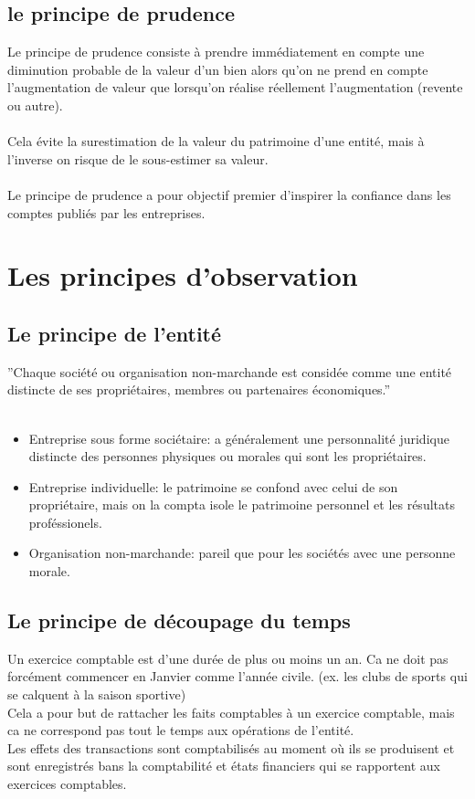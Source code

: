 \documentclass{article}
\begin{document}
\subsection{le principe de prudence}
Le principe de prudence consiste à prendre immédiatement en compte une diminution probable de la valeur d'un bien alors qu'on ne prend en compte l'augmentation de valeur que lorsqu'on réalise réellement l'augmentation (revente ou autre). \\ \\
Cela évite la surestimation de la valeur du patrimoine d'une entité, mais à l'inverse on risque de le sous-estimer sa valeur.\\ \\
Le principe de prudence a pour objectif premier d'inspirer la confiance dans les comptes publiés par les entreprises. \\

\section{Les principes d'observation}
\subsection{Le principe de l'entité}
''Chaque société ou organisation non-marchande est considée comme une entité distincte de ses propriétaires, membres ou partenaires économiques.'' \\ \\
\begin{itemize}
    \item Entreprise sous forme sociétaire: a généralement une personnalité juridique distincte des personnes physiques ou morales qui sont les propriétaires.
    \item Entreprise individuelle: le patrimoine se confond avec celui de son propriétaire, mais on la compta isole le patrimoine personnel et les résultats proféssionels.
    \item Organisation non-marchande: pareil que pour les sociétés avec une personne morale.
\end{itemize}

\subsection{Le principe de découpage du temps}
Un exercice comptable est d'une durée de plus ou moins un an. Ca ne doit pas forcément commencer en Janvier comme l'année civile. (ex. les clubs de sports qui se calquent à la saison sportive) \\
Cela a pour but de rattacher les faits comptables à un exercice comptable, mais ca ne correspond pas tout le temps aux opérations de l'entité. \\
Les effets des transactions sont comptabilisés au moment où ils se produisent et sont enregistrés bans la comptabilité et états financiers qui se rapportent aux exercices comptables.\\
\end{document}
